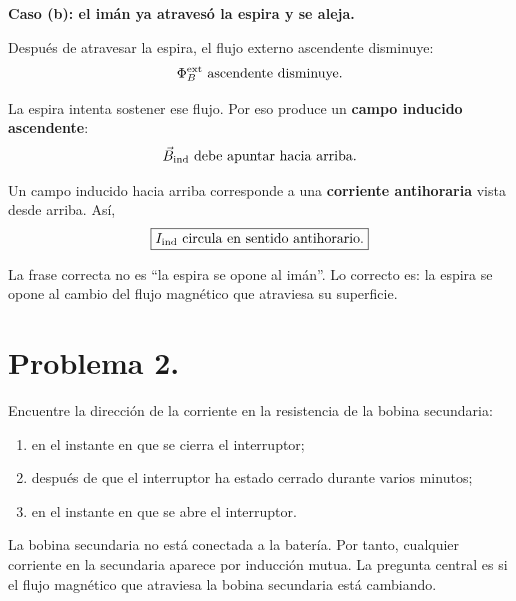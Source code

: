\documentclass[11pt]{article}
\newcommand{\paso}[1]{%
  \par\medskip
  \noindent\textbf{#1}\par
  \vspace{0.1em}%
}
\begin{document}
\paso{Caso (b): el im\'an ya atraves\'o la espira y se aleja.}
Despu\'es de atravesar la espira, el flujo externo ascendente disminuye:
\begin{equation*}
    \Phi_B^{\rm ext}\ \text{ascendente disminuye}.
\end{equation*}

La espira intenta sostener ese flujo. Por eso produce un \textbf{campo inducido ascendente}:
\begin{equation*}
    \vec B_{\rm ind}\ \text{debe apuntar hacia arriba}.
\end{equation*}

Un campo inducido hacia arriba corresponde a una \textbf{corriente antihoraria} vista desde arriba. As\'i,
\begin{equation*}
    \boxed{I_{\rm ind}\ \text{circula en sentido antihorario}.}
\end{equation*}


La frase correcta no es ``la espira se opone al im\'an''. Lo correcto es: la espira se opone al cambio del flujo magn\'etico que atraviesa su superficie.


\clearpage

\section*{Problema 2.}
Encuentre la direcci\'on de la corriente en la resistencia de la bobina secundaria:
\begin{enumerate}[label=(\alph*)]
    \item en el instante en que se cierra el interruptor;
    \item despu\'es de que el interruptor ha estado cerrado durante varios minutos;
    \item en el instante en que se abre el interruptor.
\end{enumerate}


La bobina secundaria no est\'a conectada a la bater\'ia. Por tanto, cualquier corriente en la secundaria aparece por inducci\'on mutua. La pregunta central es si el flujo magn\'etico que atraviesa la bobina secundaria est\'a cambiando.
\end{document}
